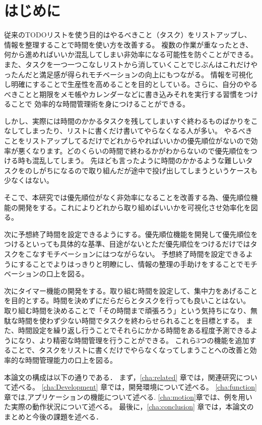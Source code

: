 \chapter{はじめに}
\label{cha:intro}

従来のTODOリストを使う目的はやるべきこと（タスク）をリストアップし、情報を整理することで時間を使い方を改善する。
複数の作業が重なったとき、何から進めればいいか混乱してしまい非効率になる可能性を防ぐことができる。
また、タスクを一つ一つこなしリストから消していくことでじぶんはこれだけやったんだと満足感が得られモチベーションの向上にもつながる。
情報を可視化し明確にすることで生産性を高めることを目的としている。さらに、自分のやるべきことと期限をメモ帳やカレンダーなどに書き込みそれを実行する習慣をつけることで
効率的な時間管理術を身につけることができる。

しかし、実際には時間のかかるタスクを残してしまいすぐ終わるものばかりをこなしてしまったり、リストに書くだけ書いてやらなくなる人が多い。
やるべきことをリストアップしてるだけでどれからやればいいかの優先順位がないので効率が悪くなります。どのくらいの時間で終わるかがわからないので優先順位をつける時も混乱してしまう。
先ほども言ったように時間のかかるような難しいタスクをのしがちになるので取り組んだが途中で投げ出してしまうというケースも少なくはない。

そこで、本研究では優先順位がなく非効率になることを改善する為、優先順位機能の開発をする。これによりどれから取り組めばいいかを可視化させ効率化を図る。

次に予想終了時間を設定できるようにする。優先順位機能を開発して優先順位をつけるといっても具体的な基準、目途がないとただ優先順位をつけるだけではタスクをこなすモチベーションにはつながらない。
予想終了時間を設定できるようにすることでよりはっきりと明瞭にし、情報の整理の手助けをすることでモチベーションの口上を図る。

次にタイマー機能の開発をする。取り組む時間を設定して、集中力をあげることを目的とする。時間を決めずにだらだらとタスクを行っても良いことはない。
取り組む時間を決めることで「その時間まで頑張ろう」という気持ちになり、無駄な時間を使わず少ない時間でタスクを終わらせられることを目標とする。
また、時間設定を繰り返し行うことでそれらにかかる時間をある程度予測できるようになり、より精密な時間管理を行うことができる。
これら3つの機能を追加することで、タスクをリストに書くだけでやらなくなってしまうことへの改善と効率的な時間管理能力の口上を図る。


本論文の構成は以下の通りである．
まず，\ref{cha:related} 章では，関連研究について述べる。
\ref{cha:Development} 章では，開発環境について述べる。
\ref{cha:function}章では,アプリケーションの機能について述べる.
\ref{cha:motion}章では、例を用いた実際の動作状況について述べる。
最後に，\ref{cha:conclusion} 章では，本論文のまとめと今後の課題を述べる．